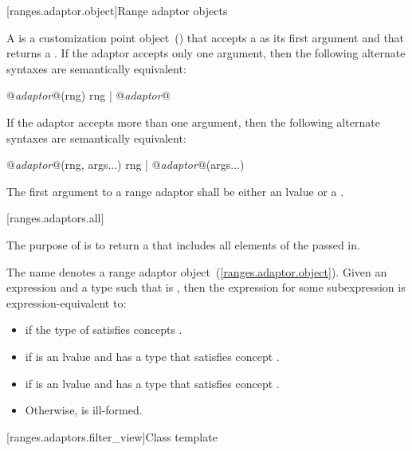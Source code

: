 [ranges.adaptor.object]{Range adaptor objects}

\pnum
A  is a customization point object~() that accepts a
 as its first argument and that returns a . If the adaptor accepts only one
argument, then the following alternate syntaxes are semantically equivalent:

\begin{codeblock}
@\textit{adaptor}@(rng)
rng | @\textit{adaptor}@
\end{codeblock}

If the adaptor accepts more than one argument, then the following alternate syntaxes are
semantically equivalent:

\begin{codeblock}
@\textit{adaptor}@(rng, args...)
rng | @\textit{adaptor}@(args...)
\end{codeblock}

\pnum
The first argument to a range adaptor shall be either an lvalue  or a .

[ranges.adaptors.all]{}

\pnum
The purpose of  is to return a  that includes all
elements of the  passed in.

\pnum
The name  denotes a range adaptor
object~(\ref{ranges.adaptor.object}). Given an expression  and a type 
such that  is , then the expression 
for some subexpression  is expression-equivalent to:

\begin{itemize}
\item {} if the type of  satisfies concepts
  .
\item {}
  if  is an lvalue and has a type that satisfies concept .
\item {}
  if  is an lvalue and has a type that satisfies concept .
\item Otherwise,  is ill-formed.
\end{itemize}

[ranges.adaptors.filter_view]{Class template }

